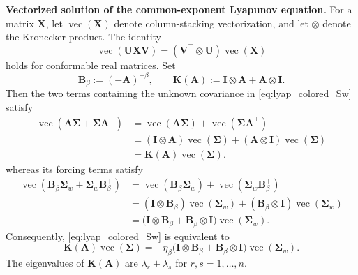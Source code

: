 \documentclass[12pt]{article}
\newcommand{\vc}{\operatorname{vec}}
\begin{document}
\textbf{Vectorized solution of the common-exponent Lyapunov equation.}
For a matrix $\mathbf X$, let $\vc(\mathbf X)$ denote column-stacking vectorization, and let $\otimes$ denote the Kronecker product. The identity
\begin{equation}
\vc(\mathbf U\mathbf X\mathbf V)=(\mathbf V^\top\otimes\mathbf U)\vc(\mathbf X)
\label{eq:vec_product_identity}
\end{equation}
holds for conformable real matrices. Set
\begin{equation}
\mathbf B_\beta:=(-\mathbf A)^{-\beta},
\qquad
\mathbf K(\mathbf A):=\mathbf I\otimes\mathbf A+\mathbf A\otimes\mathbf I.
\label{eq:kronecker_common_definitions}
\end{equation}
Then the two terms containing the unknown covariance in \eqref{eq:lyap_colored_Sw} satisfy
\begin{equation}
\begin{aligned}
\vc(\mathbf A\boldsymbol\Sigma+\boldsymbol\Sigma\mathbf A^\top)
&=\vc(\mathbf A\boldsymbol\Sigma)+\vc(\boldsymbol\Sigma\mathbf A^\top)\\
&=(\mathbf I\otimes\mathbf A)\vc(\boldsymbol\Sigma)
 +(\mathbf A\otimes\mathbf I)\vc(\boldsymbol\Sigma)\\
&=\mathbf K(\mathbf A)\vc(\boldsymbol\Sigma).
\end{aligned}
\label{eq:vec_lyapunov_operator}
\end{equation}
whereas its forcing terms satisfy
\begin{equation}
\begin{aligned}
\vc(\mathbf B_\beta\boldsymbol\Sigma_w+\boldsymbol\Sigma_w\mathbf B_\beta^\top)
&=\vc(\mathbf B_\beta\boldsymbol\Sigma_w)
 +\vc(\boldsymbol\Sigma_w\mathbf B_\beta^\top)\\
&=(\mathbf I\otimes\mathbf B_\beta)\vc(\boldsymbol\Sigma_w)
 +(\mathbf B_\beta\otimes\mathbf I)\vc(\boldsymbol\Sigma_w)\\
&=\bigl(\mathbf I\otimes\mathbf B_\beta
 +\mathbf B_\beta\otimes\mathbf I\bigr)\vc(\boldsymbol\Sigma_w).
\end{aligned}
\label{eq:vec_common_forcing}
\end{equation}
Consequently, \eqref{eq:lyap_colored_Sw} is equivalent to
\begin{equation}
\mathbf K(\mathbf A)\vc(\boldsymbol\Sigma)
=-\eta_\beta\bigl(\mathbf I\otimes\mathbf B_\beta
+\mathbf B_\beta\otimes\mathbf I\bigr)\vc(\boldsymbol\Sigma_w).
\label{eq:vec_common_linear_system}
\end{equation}
The eigenvalues of $\mathbf K(\mathbf A)$ are $\lambda_r+\lambda_s$ for $r,s=1,\ldots,n$.
\end{document}
